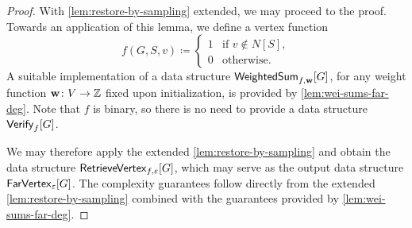 \begin{proof}
	
	With \cref{lem:restore-by-sampling} extended, we may proceed to the proof. Towards an application of this lemma, we define a vertex function
	\[f(G,S,v)\coloneqq \begin{cases}1 &\textrm{if } v\notin N[S],\\
	0 &\textrm{otherwise.}\end{cases}\]
	A suitable implementation of a data structure $\mathsf{WeightedSum}_{f,\mathbf{w}}[G]$, for any weight function $\mathbf{w}\colon V\to \mathbb{Z}$ fixed upon initialization, is provided by \cref{lem:wei-sums-far-deg}.
	Note that $f$ is binary, so there is no need to provide a data structure $\mathsf{Verify}_{f}[G]$.
	
	We may therefore apply the extended \cref{lem:restore-by-sampling} and obtain the data structure $\mathsf{RetrieveVertex}_{f,\varepsilon}[G]$, which may serve as the output data structure $\mathsf{FarVertex}_{\varepsilon}[G]$. The complexity guarantees follow directly from the extended \cref{lem:restore-by-sampling} combined with the guarantees provided by \cref{lem:wei-sums-far-deg}.
\end{proof}
	
	
%	
%	
%	
	


